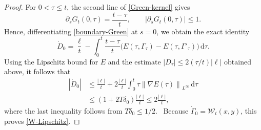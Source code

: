 \documentclass[10pt,a4paper]{amsart}
\newcommand{\dd}{\,\mathrm d}
\newcommand{\norm}[1]{\left\lVert #1\right\rVert}
\begin{document}
\begin{proof}
For $0<\tau\leq t$, the second line of \eqref{Green-kernel} gives
\begin{equation*}
 \partial_sG_t(0,\tau)=\frac{t-\tau}{t},
 \qquad |\partial_sG_t(0,\tau)|\leq1.
\end{equation*}
Hence, differentiating \eqref{boundary-Green} at $s=0$, we obtain
the exact identity
\begin{equation*}
 \dot D_0=\frac{\ell}{t}
 -\int_0^t\frac{t-\tau}{t}
 \bigl(E(\tau,\Gamma_\tau)-E(\tau,\Gamma'_\tau)\bigr)\dd\tau.
\end{equation*}
Using the Lipschitz bound for $E$ and the estimate
$|D_\tau|\leq2(\tau/t)|\ell|$ obtained above, it follows that
\begin{align*}
 |\dot D_0|
 &\leq\frac{|\ell|}{t}
 +2\frac{|\ell|}{t}
   \int_0^t\tau\norm{\nabla E(\tau)}_{L^\infty}\dd\tau\\
 &\leq(1+2T\delta_0)\frac{|\ell|}{t}
 \leq2\frac{|\ell|}{t},
\end{align*}
where the last inequality follows from $T\delta_0\leq1/2$.
\
Because $\dot\Gamma_0=\mathcal W_t(x,y)$, this proves
\eqref{W-Lipschitz}.


\end{proof}
\end{document}
